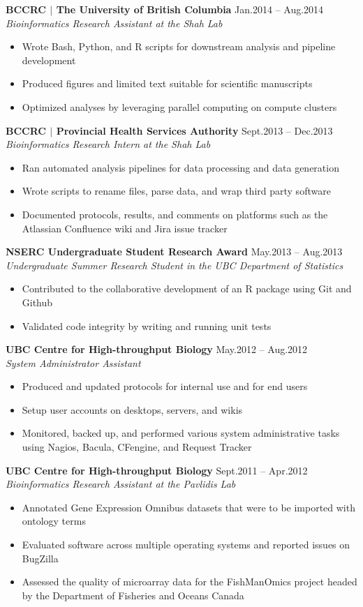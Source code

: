 \documentclass{res}
\newcommand{\linehead}[2]{%
  {\bf #1} \hfill #2\\}
\newcommand{\linetitle}[1]{%
  {\sl #1}}
\begin{document}
\begin{resume}
\linehead{BCCRC $|$ The University of British Columbia}{Jan.2014 -- Aug.2014}
\linetitle{Bioinformatics Research Assistant at the Shah Lab}
\begin{itemize}
  \item Wrote Bash, Python, and R scripts for downstream analysis and pipeline development
  \item Produced figures and limited text suitable for scientific manuscripts
  \item Optimized analyses by leveraging parallel computing on compute clusters
\end{itemize}

\linehead{BCCRC $|$ Provincial Health Services Authority}{Sept.2013 -- Dec.2013}
\linetitle{Bioinformatics Research Intern at the Shah Lab}
\begin{itemize}
  \item Ran automated analysis pipelines for data processing and data generation
  \item Wrote scripts to rename files, parse data, and wrap third party software
  \item Documented protocols, results, and comments on platforms such as the Atlassian Confluence wiki and Jira issue tracker
\end{itemize}

\linehead{NSERC Undergraduate Student Research Award}{May.2013 -- Aug.2013}
\linetitle{Undergraduate Summer Research Student in the UBC Department of Statistics}
\begin{itemize}
  \item Contributed to the collaborative development of an R package using Git and Github
  \item Validated code integrity by writing and running unit tests
\end{itemize}

\linehead{UBC Centre for High-throughput Biology}{May.2012 -- Aug.2012}
\linetitle{System Administrator Assistant}
\begin{itemize}
  \item Produced and updated protocols for internal use and for end users
  \item Setup user accounts on desktops, servers, and wikis
  \item Monitored, backed up, and performed various system administrative tasks using Nagios, Bacula, CFengine, and Request Tracker
\end{itemize}

\linehead{UBC Centre for High-throughput Biology}{Sept.2011 -- Apr.2012}
\linetitle{Bioinformatics Research Assistant at the Pavlidis Lab}
\begin{itemize}
  \item Annotated Gene Expression Omnibus datasets that were to be imported with ontology terms
  \item Evaluated software across multiple operating systems and reported issues on BugZilla
  \item Assessed the quality of microarray data for the FishManOmics project headed by the Department of Fisheries and Oceans Canada
\end{itemize}


\end{resume}
\end{document}

